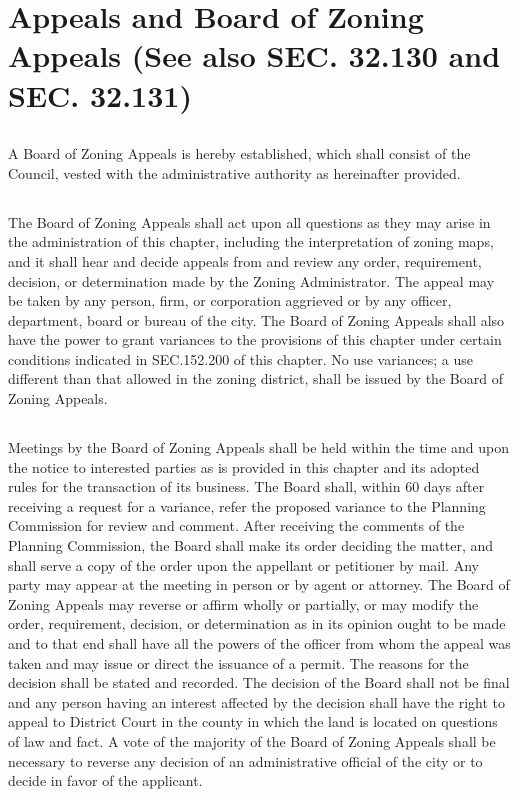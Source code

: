 \section{Appeals and Board of Zoning Appeals (See also SEC. 32.130 and SEC. 32.131)}
\subsection{}
A Board of Zoning Appeals is hereby established, which shall consist of the Council, vested with the administrative authority as hereinafter provided.
\subsection{}
The Board of Zoning Appeals shall act upon all questions as they may arise in the administration of this chapter, including the interpretation of zoning maps, and it shall hear and decide appeals from and review any order, requirement, decision, or determination made by the Zoning Administrator. The appeal may be taken by any person, firm, or corporation aggrieved or by any officer, department, board or bureau of the city. The Board of Zoning Appeals shall also have the power to grant variances to the provisions of this chapter under certain conditions indicated in SEC.152.200 of this chapter. No use variances; a use different than that allowed in the zoning district, shall be issued by the Board of Zoning Appeals.
\subsection{}
Meetings by the Board of Zoning Appeals shall be held within the time and upon the notice to interested parties as is provided in this chapter and its adopted rules for the transaction of its business. The Board shall, within 60 days after receiving a request for a variance, refer the proposed variance to the Planning Commission for review and comment. After receiving the comments of the Planning Commission, the Board shall make its order deciding the matter, and shall serve a copy of the order upon the appellant or petitioner by mail. Any party may appear at the meeting in person or by agent or attorney. The Board of Zoning Appeals may reverse or affirm wholly or partially, or may modify the order, requirement, decision, or determination as in its opinion ought to be made and to that end shall have all the powers of the officer from whom the appeal was taken and may issue or direct the issuance of a permit. The reasons for the decision shall be stated and recorded.  The decision of the Board shall not be final and any person having an interest affected by the decision shall have the right to appeal to District Court in the county in which the land is located on questions of law and fact. A vote of the majority of the Board of Zoning Appeals shall be necessary to reverse any decision of an administrative official of the city or to decide in favor of the applicant.

